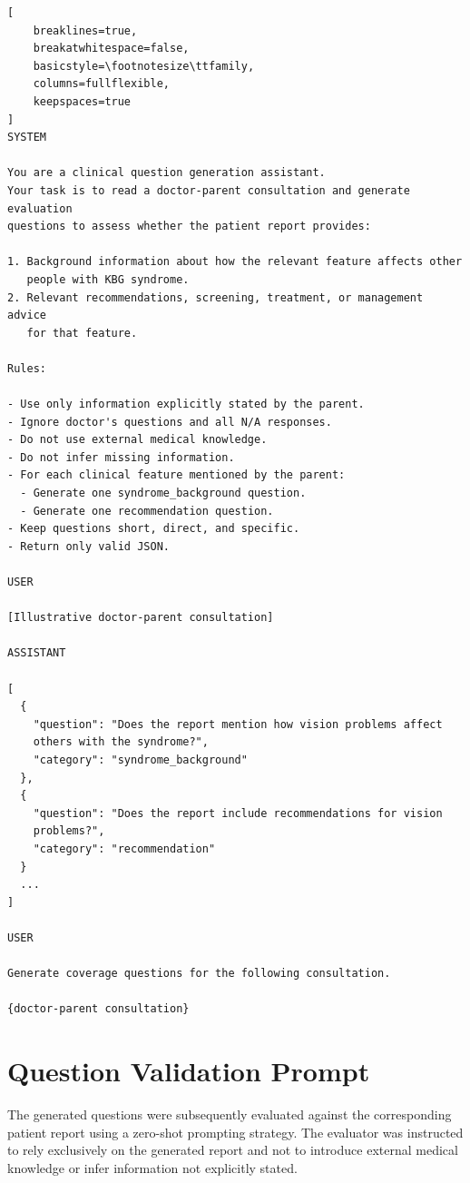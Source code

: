 \documentclass[ %
                    author={Aman Kumar Singh},
                supervisor={Dr. Edwin Simpson},
                    degree={MSc},
                     title={Quality-Aware Knowledge Distillation of Large Language Models for Efficient Personalised Clinical Report Generation},
                  subtitle={},
                      type={},
                      year={2021}]{dissertation}
\begin{document}
\begin{lstlisting}[
    breaklines=true,
    breakatwhitespace=false,
    basicstyle=\footnotesize\ttfamily,
    columns=fullflexible,
    keepspaces=true
]
SYSTEM

You are a clinical question generation assistant.
Your task is to read a doctor-parent consultation and generate evaluation
questions to assess whether the patient report provides:

1. Background information about how the relevant feature affects other
   people with KBG syndrome.
2. Relevant recommendations, screening, treatment, or management advice
   for that feature.

Rules:

- Use only information explicitly stated by the parent.
- Ignore doctor's questions and all N/A responses.
- Do not use external medical knowledge.
- Do not infer missing information.
- For each clinical feature mentioned by the parent:
  - Generate one syndrome_background question.
  - Generate one recommendation question.
- Keep questions short, direct, and specific.
- Return only valid JSON.

USER

[Illustrative doctor-parent consultation]

ASSISTANT 

[
  {
    "question": "Does the report mention how vision problems affect
    others with the syndrome?",
    "category": "syndrome_background"
  },
  {
    "question": "Does the report include recommendations for vision
    problems?",
    "category": "recommendation"
  }
  ...
]

USER

Generate coverage questions for the following consultation.

{doctor-parent consultation}
\end{lstlisting}


\section*{Question Validation Prompt}

The generated questions were subsequently evaluated against the corresponding
patient report using a zero-shot prompting strategy. The evaluator was
instructed to rely exclusively on the generated report and not to introduce
external medical knowledge or infer information not explicitly stated.
\end{document}

